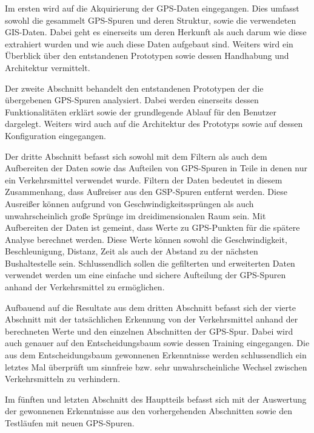 Im ersten wird auf die Akquirierung der GPS-Daten eingegangen. Dies umfasst sowohl die gesammelt GPS-Spuren und deren Struktur, sowie die verwendeten GIS-Daten. Dabei geht es einerseits um deren Herkunft als auch darum wie diese extrahiert wurden und wie auch diese Daten aufgebaut sind. Weiters wird ein Überblick über den entstandenen Prototypen sowie dessen Handhabung und Architektur vermittelt.

Der zweite Abschnitt behandelt den entstandenen Prototypen der die übergebenen GPS-Spuren analysiert. Dabei werden einerseits dessen Funktionalitäten erklärt sowie der grundlegende Ablauf für den Benutzer dargelegt. Weiters wird auch auf die Architektur des Prototyps sowie auf dessen Konfiguration eingegangen.

Der dritte Abschnitt befasst sich sowohl mit dem Filtern als auch dem Aufbereiten der Daten sowie das Aufteilen von GPS-Spuren in Teile in denen nur ein Verkehrsmittel verwendet wurde. Filtern der Daten bedeutet in diesem Zusammenhang, dass Außreiser aus den GSP-Spuren entfernt werden. Diese Ausreißer können aufgrund von Geschwindigkeitssprüngen als auch unwahrscheinlich große Sprünge im dreidimensionalen Raum sein. Mit Aufbereiten der Daten ist gemeint, dass Werte zu GPS-Punkten für die spätere Analyse berechnet werden. Diese Werte können sowohl die Geschwindigkeit, Beschleunigung, Distanz, Zeit als auch der Abstand zu der nächsten Bushaltestelle sein. Schlussendlich sollen die gefilterten und erweiterten Daten verwendet werden um eine einfache und sichere Aufteilung der GPS-Spuren anhand der Verkehrsmittel zu ermöglichen.

Aufbauend auf die Resultate aus dem dritten Abschnitt befasst sich der vierte Abschnitt mit der tatsächlichen Erkennung von der Verkehrsmittel anhand der berechneten Werte und den einzelnen Abschnitten der GPS-Spur. Dabei wird auch genauer auf den Entscheidungsbaum sowie dessen Training eingegangen. Die aus dem Entscheidungsbaum gewonnenen Erkenntnisse werden schlussendlich ein letztes Mal überprüft um sinnfreie bzw. sehr unwahrscheinliche Wechsel zwischen Verkehrsmitteln zu verhindern.

Im fünften und letzten Abschnitt des Hauptteils befasst sich mit der Auswertung der gewonnenen Erkenntnisse aus den vorhergehenden Abschnitten sowie den Testläufen mit neuen GPS-Spuren. 
